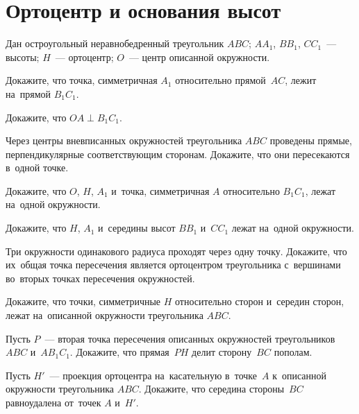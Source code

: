 
\section*{Ортоцентр и основания высот}


Дан остроугольный неравнобедренный треугольник $ABC$;
$A A_1$, $B B_1$, $C C_1$~— высоты;
$H$~— ортоцентр;
$O$~— центр описанной окружности.

\begin{problems}

\item
Докажите, что точка, симметричная $A_1$ относительно прямой~$AC$, лежит
на~прямой $B_1 C_1$.

\item
Докажите, что $OA \perp B_1 C_1$.

\item
Через центры вневписанных окружностей треугольника $ABC$ проведены прямые,
перпендикулярные соответствующим сторонам.
Докажите, что они пересекаются в~одной точке.

\item
Докажите, что $O$, $H$, $A_1$ и~точка, симметричная $A$ относительно $B_1 C_1$,
лежат на~одной окружности.

\item
Докажите, что $H$, $A_1$ и~середины высот $B B_1$ и~$C C_1$ лежат на~одной
окружности.

\item
Три окружности одинакового радиуса проходят через одну точку.
Докажите, что их~общая точка пересечения является ортоцентром треугольника
с~вершинами во~вторых точках пересечения окружностей.


\item
Докажите, что точки, симметричные $H$ относительно сторон и~середин сторон,
лежат на~описанной окружности треугольника $ABC$.

\item
Пусть $P$~— вторая точка пересечения описанных окружностей треугольников
$ABC$ и~$A B_1 C_1$.
Докажите, что прямая~$PH$ делит сторону~$BC$ пополам.

\item
Пусть $H'$~— проекция ортоцентра на~касательную в~точке~$A$ к~описанной
окружности треугольника $ABC$.
Докажите, что середина стороны~$BC$ равноудалена от~точек $A$ и~$H'$.


\end{problems}
